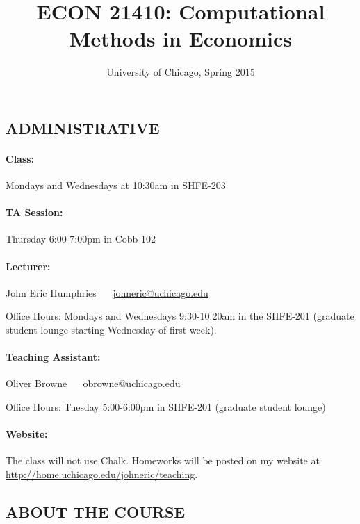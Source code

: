 \documentclass{scrartcl}
\title{ECON 21410: Computational Methods in Economics}
\subtitle{University of Chicago, Spring 2015}
\date{}
\begin{document}
\maketitle


\subsection*{ADMINISTRATIVE}

\paragraph{Class:} Mondays and Wednesdays at 10:30am in SHFE-203

\paragraph{TA Session:} Thursday 6:00-7:00pm in Cobb-102

\paragraph{Lecturer:}  
John Eric Humphries ~~ \href{mailto:johneric@uchicago.edu}{johneric@uchicago.edu}

Office Hours: Mondays and Wednesdays 9:30-10:20am in the SHFE-201 (graduate student lounge starting Wednesday of first week). 

\paragraph{Teaching Assistant:}
Oliver Browne ~~  \href{mailto:obrowne@uchicago.edu}{obrowne@uchicago.edu}

Office Hours: Tuesday 5:00-6:00pm in SHFE-201 (graduate student lounge)

\paragraph{Website:}

The class will not use Chalk. Homeworks will be posted on my website at \href{http://home.uchicago.edu/johneric/teaching}{http://home.uchicago.edu/johneric/teaching}.
\subsection*{ABOUT THE COURSE}
\end{document}
